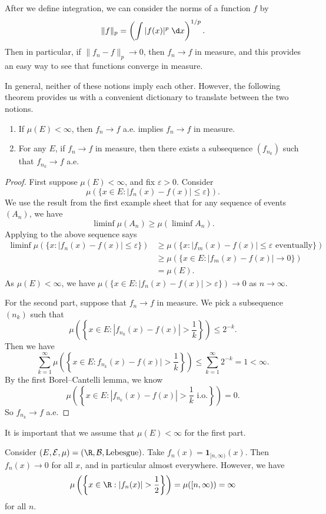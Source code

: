 \documentclass[a4paper]{article}
\begin{document}
After we define integration, we can consider the norms of a function $f$ by
\[
  \|f\|_p = \left(\int |f(x)|^p \;\d x\right)^{1/p}.
\]
Then in particular, if $\|f_n - f\|_p \to 0$, then $f_n \to f$ in measure, and this provides an easy way to see that functions converge in measure.

In general, neither of these notions imply each other. However, the following theorem provides us with a convenient dictionary to translate between the two notions.

\begin{thm}\leavevmode
  \begin{enumerate}
    \item If $\mu(E) < \infty$, then $f_n \to f$ a.e. implies $f_n \to f$ in measure.
    \item For any $E$, if $f_n \to f$ in measure, then there exists a subsequence $(f_{n_k})$ such that $f_{n_k} \to f$ a.e.
  \end{enumerate}
\end{thm}

\begin{proof}
  First suppose $\mu(E) < \infty$, and fix $\varepsilon > 0$. Consider
  \[
    \mu(\{x \in E: |f_n(x) - f(x)|\leq \varepsilon\}).
  \]
  We use the result from the first example sheet that for any sequence of events $(A_n)$, we have
  \[
    \liminf \mu(A_n) \geq \mu(\liminf A_n).
  \]
  Applying to the above sequence says
  \begin{align*}
    \liminf \mu(\{x: |f_n(x) - f(x)|\leq \varepsilon\}) &\geq \mu(\{x: |f_m (x) - f(x)| \leq \varepsilon\text{ eventually}\})\\
    &\geq \mu(\{x \in E: |f_m(x) - f(x)| \to 0\})\\
    &= \mu(E).
  \end{align*}
  As $\mu(E) < \infty$, we have $\mu(\{x \in E: |f_n(x) - f(x)| > \varepsilon\}) \to 0$ as $n \to \infty$.

  \separator

  For the second part, suppose that $f_n \to f$ in measure. We pick a subsequence $(n_k)$ such that
  \[
    \mu\left(\left\{x \in E: |f_{n_k}(x) - f(x)| > \frac{1}{k}\right\}\right) \leq 2^{-k}.
  \]
  Then we have
  \[
    \sum_{k = 1}^\infty \mu\left(\left\{x \in E: f_{n_k}(x) - f(x)|> \frac{1}{k}\right\}\right) \leq \sum_{k = 1}^\infty 2^{-k} = 1 < \infty.
  \]
  By the first Borel--Cantelli lemma, we know
  \[
    \mu\left(\left\{x \in E: |f_{n_k}(x) - f(x)| > \frac{1}{k} \text{ i.o.}\right\}\right) = 0.
  \]
  So $f_{n_k} \to f$ a.e.
\end{proof}
It is important that we assume that $\mu(E) < \infty$ for the first part.
\begin{eg}
  Consider $(E, \mathcal{E}, \mu) = (\R, \mathcal{B}, \text{Lebesgue})$. Take $f_n(x) = \mathbf{1}_{[n, \infty)}(x)$. Then $f_n(x) \to 0$ for all $x$, and in particular almost everywhere. However, we have
  \[
    \mu\left(\left\{x \in \R: |f_n(x)| > \frac{1}{2}\right\}\right) = \mu([n, \infty)) = \infty
  \]
  for all $n$.
\end{eg}
\end{document}

